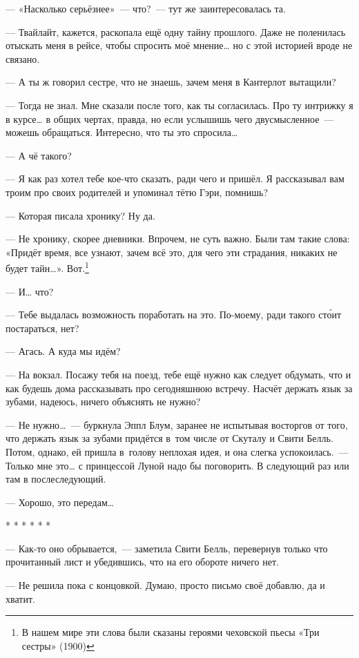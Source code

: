 \documentclass[fontsize=11pt,a5paper,titlepage=firstcover]{scrbook}
\begin{document}
--- «Насколько серьёзнее»~--- что?~--- тут же заинтересовалась та.

--- Твайлайт, кажется, раскопала ещё одну тайну прошлого. Даже не поленилась отыскать меня в рейсе, чтобы спросить моё мнение{\ldots} но с этой историей вроде не связано.

--- А ты ж говорил сестре, что не знаешь, зачем меня в Кантерлот вытащили?

--- Тогда не знал. Мне сказали после того, как ты согласилась. Про ту интрижку я в курсе{\ldots} в общих чертах, правда, но если услышишь чего двусмысленное~--- можешь обращаться. Интересно, что ты это спросила{\ldots}

--- А чё такого?

--- Я как раз хотел тебе кое-что сказать, ради чего и пришёл. Я рассказывал вам троим про своих родителей и упоминал тётю Гэри, помнишь?

--- Которая писала хронику? Ну да.

--- Не хронику, скорее дневники. Впрочем, не суть важно. Были там такие слова: «Придёт время, все узнают, зачем всё это, для чего эти страдания, никаких не будет тайн…». Вот.\footnote{В нашем мире эти слова были сказаны героями чеховской пьесы «Три сестры» (1900)}

--- И{\ldots} что?

--- Тебе выдалась возможность поработать на это. По-моему, ради такого сто́ит постараться, нет?

--- Агась. А куда мы идём?

--- На вокзал. Посажу тебя на поезд, тебе ещё нужно как следует обдумать, что и как будешь дома рассказывать про сегодняшнюю встречу. Насчёт держать язык за зубами, надеюсь, ничего объяснять не нужно?

--- Не нужно{\ldots}~--- буркнула Эппл Блум, заранее не испытывая восторгов от того, что держать язык за зубами придётся в~том числе от Скуталу и Свити Белль. Потом, однако, ей пришла в~голову неплохая идея, и она слегка успокоилась.~--- Только мне это{\ldots} с принцессой Луной надо бы поговорить. В следующий раз или там в послеследующий.

--- Хорошо, это передам{\ldots}
\begin{center}
	* * * * * *
\end{center}

--- Как-то оно обрывается,~--- заметила Свити Белль, перевернув только что прочитанный лист и убедившись, что на его обороте ничего нет.

--- Не решила пока с концовкой. Думаю, просто письмо своё добавлю, да и хватит.
\end{document}
